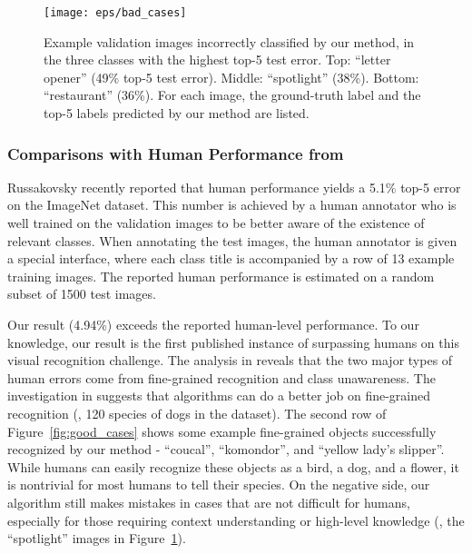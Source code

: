 \documentclass[10pt,twocolumn,letterpaper]{article}
\begin{document}
\begin{figure}[t]
\begin{center}
\texttt{[image: eps/bad\_cases]}
\end{center}
\caption{Example validation images incorrectly classified by our method, in the three classes with the highest top-5 test error. Top: ``letter opener'' (49\% top-5 test error). Middle: ``spotlight'' (38\%). Bottom: ``restaurant'' (36\%). For each image, the ground-truth label and the top-5 labels predicted by our method are listed.}
\label{fig:bad_cases}
\end{figure}

\subsubsection*{Comparisons with Human Performance from \cite{Russakovsky2014}}

Russakovsky \etal \cite{Russakovsky2014} recently reported that human performance yields a 5.1\% top-5 error on the ImageNet dataset. This number is achieved by a human annotator who is well trained on the validation images to be better aware of the existence of relevant classes. When annotating the test images, the human annotator is given a special interface, where each class title is accompanied by a row of 13 example training images. The reported human performance is estimated on a random subset of 1500 test images.

Our result (4.94\%) exceeds the reported human-level performance. To our knowledge, our result is the first published instance of surpassing humans on this visual recognition challenge. The analysis in \cite{Russakovsky2014} reveals that the two major types of human errors come from fine-grained recognition and class unawareness. The investigation in \cite{Russakovsky2014} suggests that algorithms can do a better job on fine-grained recognition (\eg, 120 species of dogs in the dataset). The second row of Figure~\ref{fig:good_cases} shows some example fine-grained objects successfully recognized by our method - ``coucal'', ``komondor'', and ``yellow lady's slipper''. While humans can easily recognize these objects as a bird, a dog, and a flower, it is nontrivial for most humans to tell their species.
On the negative side, our algorithm still makes mistakes in cases that are not difficult for humans, especially for those requiring context understanding or high-level knowledge (\eg, the ``spotlight'' images in Figure~\ref{fig:bad_cases}).
\end{document}
